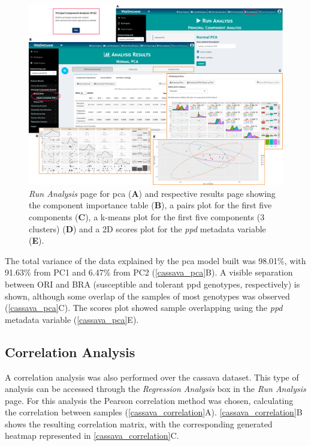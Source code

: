 \begin{figure}[H]
	\centering
	\includegraphics[width=1\linewidth]{Imagens/CassavaPPD/pca}
	\caption{\textit{Run Analysis} page for \gls{pca} (\textbf{A}) and respective results page showing the component importance table (\textbf{B}), a pairs plot for the first five components (\textbf{C}), a k-means plot for the first five components (3 clusters) (\textbf{D}) and a 2D scores plot for the \textit{ppd} metadata variable (\textbf{E}).}
	\label{cassava_pca}
\end{figure}

The total variance of the data explained by the \gls{pca} model built was 98.01\%, with 91.63\% from PC1 and 6.47\% from PC2 (\autoref{cassava_pca}B). A visible separation between ORI and BRA (susceptible and tolerant \gls{ppd} genotypes, respectively) is shown, although some overlap of the samples of most genotypes was observed (\autoref{cassava_pca}C). The scores plot showed sample overlapping using the \textit{ppd} metadata variable (\autoref{cassava_pca}E).



\subsection{Correlation Analysis}

A correlation analysis was also performed over the cassava dataset. This type of analysis can be accessed through the \textit{Regression Analysis} box in the \textit{Run Analysis} page. For this analysis the Pearson correlation method was chosen, calculating the correlation between samples (\autoref{cassava_correlation}A). \autoref{cassava_correlation}B shows the resulting correlation matrix, with the corresponding generated heatmap represented in \autoref{cassava_correlation}C.


